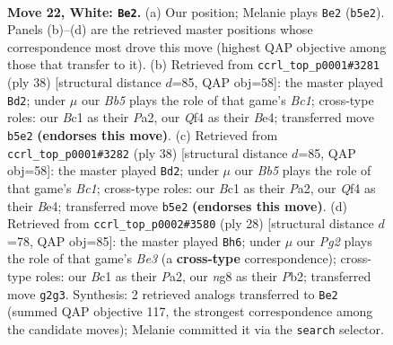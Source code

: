 \documentclass[11pt]{article}
\begin{document}
\clearpage

\begin{figure}[p]\centering
\begin{subfigure}{0.46\textwidth}\centering
\resizebox{\linewidth}{!}{%
\newchessgame
\chessboard[
  setfen={r2k1bn1/1b2q3/8/pBp1Pp1r/3p1Q1p/NP5P/P5P1/R1B3KR w - - 1 22},
  showmover=false,
  pgfstyle=straightmove, color=movearrow, markmove={b5-e2}
]}
\caption{}
\end{subfigure}\hfill
\begin{subfigure}{0.46\textwidth}\centering
\resizebox{\linewidth}{!}{%
\newchessgame
\chessboard[
  setfen={r1b2rk1/1p4bp/2p2q2/6n1/p1P1BN2/Q5P1/PP3P2/1RB1R1K1 w - - 0 20},
  showmover=false,
  pgfstyle=straightmove, color=movearrow, markmove={c1-d2}
]}
\caption{}
\end{subfigure}
\\[4pt]
\begin{subfigure}{0.46\textwidth}\centering
\resizebox{\linewidth}{!}{%
\newchessgame
\chessboard[
  setfen={r1b2rk1/1p4bp/2p2q2/6n1/p1P1BN2/Q5P1/PP3P2/1RB1R1K1 w - - 0 20},
  showmover=false,
  pgfstyle=straightmove, color=movearrow, markmove={c1-d2}
]}
\caption{}
\end{subfigure}\hfill
\begin{subfigure}{0.46\textwidth}\centering
\resizebox{\linewidth}{!}{%
\newchessgame
\chessboard[
  setfen={r2qk2r/pp3p1p/6p1/3pPb1n/3Q3b/2N1B3/PPP3BP/R4K1R w kq - 0 15},
  showmover=false,
  pgfstyle=straightmove, color=movearrow, markmove={e3-h6}
]}
\caption{}
\end{subfigure}
\caption{\textbf{Move 22, White: \texttt{Be2}.} (a) Our position; Melanie plays \texttt{Be2} (\texttt{b5e2}). Panels (b)--(d) are the retrieved master positions whose correspondence most drove this move (highest QAP objective among those that transfer to it). (b) Retrieved from \texttt{ccrl\_top\_p0001\#3281} (ply 38) [structural distance $d$=85, QAP obj=58]: the master played \texttt{Bd2}; under $\mu$ our \emph{Bb5} plays the role of that game's \emph{Bc1}; cross-type roles: our \emph{B}c1 as their \emph{P}a2, our \emph{Q}f4 as their \emph{B}e4; transferred move \texttt{b5e2} \textbf{(endorses this move)}. (c) Retrieved from \texttt{ccrl\_top\_p0001\#3282} (ply 38) [structural distance $d$=85, QAP obj=58]: the master played \texttt{Bd2}; under $\mu$ our \emph{Bb5} plays the role of that game's \emph{Bc1}; cross-type roles: our \emph{B}c1 as their \emph{P}a2, our \emph{Q}f4 as their \emph{B}e4; transferred move \texttt{b5e2} \textbf{(endorses this move)}. (d) Retrieved from \texttt{ccrl\_top\_p0002\#3580} (ply 28) [structural distance $d$=78, QAP obj=85]: the master played \texttt{Bh6}; under $\mu$ our \emph{Pg2} plays the role of that game's \emph{Be3} (a \textbf{cross-type} correspondence); cross-type roles: our \emph{B}c1 as their \emph{P}a2, our \emph{n}g8 as their \emph{P}b2; transferred move \texttt{g2g3}. Synthesis: 2 retrieved analogs transferred to \texttt{Be2} (summed QAP objective 117, the strongest correspondence among the candidate moves); Melanie committed it via the \texttt{search} selector.}
\label{fig:thought-m42}
\end{figure}
\end{document}
